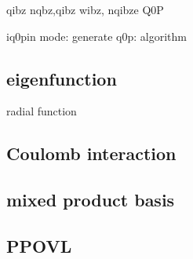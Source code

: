 \documentclass[a4paper,10pt,epsf,fleqn]{article}
\begin{document}
qibz nqbz,qibz wibz, 
nqibze Q0P

iq0pin mode:
generate q0p: algorithm

\subsection{eigenfunction}
radial function

\subsection{Coulomb interaction}

\subsection{mixed product basis}
\subsection{PPOVL}


\newpage 



\end{document}
